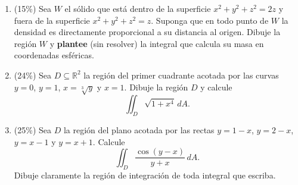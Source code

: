 \documentclass[11pt]{article}
\begin{document}
\begin{enumerate}
\newpage
\item{} (15\%) Sea $W$ el sólido que está dentro de la superficie $x^2+y^2+z^2=2z$ y fuera de la superficie $x^2+y^2+z^2=z$. Suponga que en todo punto de $W$ la densidad es directamente proporcional a su distancia al origen. Dibuje la región $W$ y \textbf{plantee} (sin resolver) la integral que calcula su masa en coordenadas esféricas.

\vspace{6cm}

\item{} (24\%) Sea $D\subseteq\mathbb{R}^2$ la región del primer cuadrante acotada por las curvas $y=0$, $y=1$, $x=\sqrt[3]{y}$ y $x=1$. Dibuje la región $D$ y calcule
\[
\iint_D \sqrt{1+x^4}\,dA.
\]

\vspace{7cm}

\item{} (25\%) Sea $D$ la región del plano acotada por las rectas $y=1-x$, $y=2-x$, $y=x-1$ y $y=x+1$. Calcule
\[
\iint_D \frac{\cos(y-x)}{y+x}\,dA.
\]
\noindent Dibuje claramente la región de integración de toda integral que escriba.

\vspace{7cm}
\end{enumerate}

\examfooter
\end{document}
